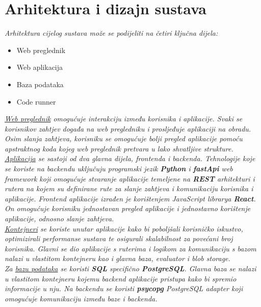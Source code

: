 \chapter{Arhitektura i dizajn sustava}
	\textit{Arhitektura cijelog sustava može se podijeliti na četiri ključna dijela:}
		\begin{itemize}
    		\item Web preglednik
    		\item Web aplikacija
    		\item Baza podataka
    		\item Code runner
		\end{itemize}

	\textit{\underline{Web preglednik} omogućuje interakciju između korisnika i aplikacije. Svaki se korisnikov zahtjev
	 događa na web pregledniku i prosljeđuje aplikaciji na obradu. Osim slanja zahtjeva, korisniku se omogućuje
	  bolji pregled aplikacije pomoću apstraktnog koda kojeg web preglednik pretvara u lako shvatljive strukture.}\\

	\textit{\underline{Aplikacija} se sastoji od dva glavna dijela, frontenda i backenda. Tehnologije koje se koriste na backendu
	 uključuju programski jezik \textbf{Python} i \textbf{fastApi} web framework koji omogućuje stvaranje aplikacije temeljene na \textbf{REST}
	 arhitekturi i rutera na kojem su definirane rute za slanje zahtjeva i komunikaciju korisnika i aplikacije.
	 Frontend aplikacije izrađen je korištenjem JavaScript librarya \textbf{React}. On omogućuje korisniku jednostavan pregled
	 aplikacije i jednostavno korištenje aplikacije, odnosno slanje zahtjeva.}\\

	\textit{\underline{Kontejneri} se koriste unutar aplikacije kako bi poboljšali korisničko iskustvo, optimizirali performanse sustava
	te osigurali skalabilnost za povećani broj korisnika. Glavni se dio aplikacije s ruterima i logikom za komunikaciju s 
	bazom nalazi u vlastitom kontejneru kao i glavna baza, evaluator i blob storage.}\\

	\textit{Za \underline{bazu podataka} se koristi \textbf{SQL} specifično \textbf{PostgreSQL}. Glavna baza se nalazi u vlastitom kontejneru kojemu backend
	aplikacije pristupa kako bi spremio informacije u nju. Na backendu se koristi \textbf{psycopg} PostgreSQL adapter koji omogućuje
	komunikaciju između baze i backenda.}\\
	
